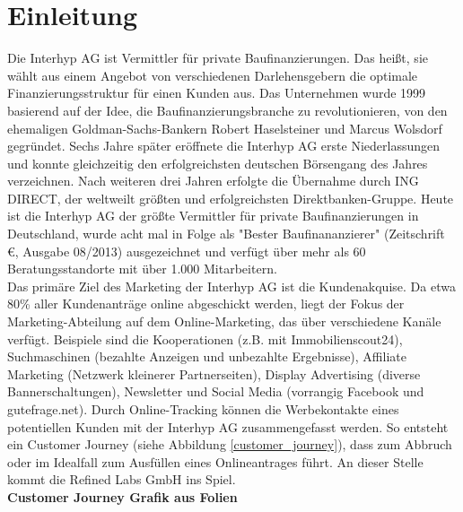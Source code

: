 \section{Einleitung}

Die Interhyp AG ist Vermittler für private Baufinanzierungen. Das heißt, sie wählt aus einem Angebot von verschiedenen Darlehensgebern die optimale Finanzierungsstruktur für einen Kunden aus. Das Unternehmen wurde 1999 basierend auf der Idee, die Baufinanzierungsbranche zu revolutionieren, von den ehemaligen Goldman-Sachs-Bankern Robert Haselsteiner und Marcus Wolsdorf gegründet. Sechs Jahre später eröffnete die Interhyp AG erste Niederlassungen und konnte gleichzeitig den erfolgreichsten deutschen Börsengang des Jahres verzeichnen. Nach weiteren drei Jahren erfolgte die Übernahme durch ING DIRECT, der weltweilt größten und erfolgreichsten Direktbanken-Gruppe. Heute ist die Interhyp AG der größte Vermittler für private Baufinanzierungen in Deutschland, wurde acht mal in Folge als "Bester Baufinananzierer" (Zeitschrift \euro, Ausgabe 08/2013) ausgezeichnet und verfügt über mehr als 60 Beratungsstandorte mit über 1.000 Mitarbeitern.\\
Das primäre Ziel des Marketing der Interhyp AG ist die Kundenakquise. Da etwa 80\% aller Kundenanträge online abgeschickt werden, liegt der Fokus der Marketing-Abteilung auf dem Online-Marketing, das über verschiedene Kanäle verfügt. Beispiele sind die Kooperationen (z.B. mit Immobilienscout24), Suchmaschinen (bezahlte Anzeigen und unbezahlte Ergebnisse), Affiliate Marketing (Netzwerk kleinerer Partnerseiten), Display Advertising (diverse Bannerschaltungen), Newsletter und Social Media (vorrangig Facebook und gutefrage.net). Durch Online-Tracking können die Werbekontakte eines potentiellen Kunden mit der Interhyp AG zusammengefasst werden. So entsteht ein Customer Journey (siehe Abbildung \ref{customer_journey}), dass zum Abbruch oder im Idealfall zum Ausfüllen eines Onlineantrages führt. An dieser Stelle kommt die Refined Labs GmbH ins Spiel.\\
\textbf{Customer Journey Grafik aus Folien}


